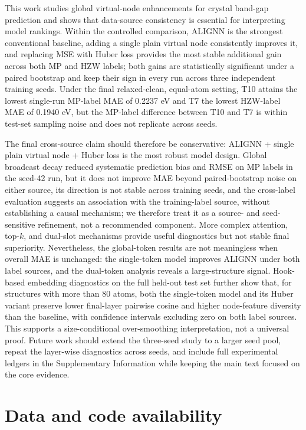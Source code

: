 \documentclass[a4paper,11pt]{article}
\begin{document}
This work studies global virtual-node enhancements for crystal band-gap prediction and shows that data-source consistency is essential for interpreting model rankings. Within the controlled comparison, ALIGNN is the strongest conventional baseline, adding a single plain virtual node consistently improves it, and replacing MSE with Huber loss provides the most stable additional gain across both MP and HZW labels; both gains are statistically significant under a paired bootstrap and keep their sign in every run across three independent training seeds. Under the final relaxed-clean, equal-atom setting, T10 attains the lowest single-run MP-label MAE of 0.2237 eV and T7 the lowest HZW-label MAE of 0.1940 eV, but the MP-label difference between T10 and T7 is within test-set sampling noise and does not replicate across seeds.

The final cross-source claim should therefore be conservative: ALIGNN + single plain virtual node + Huber loss is the most robust model design. Global broadcast decay reduced systematic prediction bias and RMSE on MP labels in the seed-42 run, but it does not improve MAE beyond paired-bootstrap noise on either source, its direction is not stable across training seeds, and the cross-label evaluation suggests an association with the training-label source, without establishing a causal mechanism; we therefore treat it as a source- and seed-sensitive refinement, not a recommended component. More complex attention, top-\(k\), and dual-slot mechanisms provide useful diagnostics but not stable final superiority. Nevertheless, the global-token results are not meaningless when overall MAE is unchanged: the single-token model improves ALIGNN under both label sources, and the dual-token analysis reveals a large-structure signal. Hook-based embedding diagnostics on the full held-out test set further show that, for structures with more than 80 atoms, both the single-token model and its Huber variant preserve lower final-layer pairwise cosine and higher node-feature diversity than the baseline, with confidence intervals excluding zero on both label sources. This supports a size-conditional over-smoothing interpretation, not a universal proof. Future work should extend the three-seed study to a larger seed pool, repeat the layer-wise diagnostics across seeds, and include full experimental ledgers in the Supplementary Information while keeping the main text focused on the core evidence.

\section*{Data and code availability}
\end{document}
